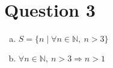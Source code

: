 \documentclass[12pt]{article}
\begin{document}
\section*{Question 3}
\begin{enumerate}[a.]
    \item

    $S = \{n \mid \forall n \in \mathbb{N},\:n > 3\}$

    \item

    $\forall n \in \mathbb{N},\:n > 3 \Rightarrow n > 1$

\end{enumerate}
\end{document}
